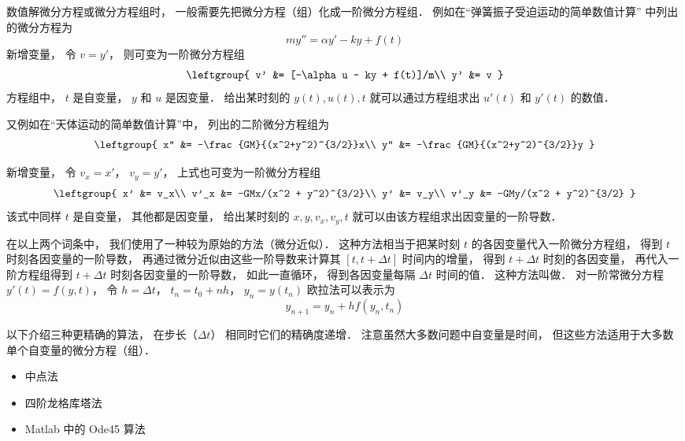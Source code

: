 

数值解微分方程或微分方程组时， 一般需要先把微分方程（组）化成一阶微分方程组． 例如在“弹簧振子受迫运动的简单数值计算” 中列出的微分方程为
\begin{equation}
m y'' = \alpha y' - ky + f(t)
\end{equation}
新增变量， 令 $v = y'$， 则可变为一阶微分方程组
\begin{equation}\leftgroup{
v' &= [-\alpha u - ky + f(t)]/m\\
y' &= v
}\end{equation}
方程组中， $t$ 是自变量， $y$ 和 $u$ 是因变量． 给出某时刻的 $y(t), u(t), t$ 就可以通过方程组求出 $u'(t)$ 和 $y'(t)$ 的数值．

又例如在“天体运动的简单数值计算”中， 列出的二阶微分方程组为
\begin{equation}
\leftgroup{
x'' &= -\frac{GM}{(x^2+y^2)^{3/2}}x\\
y'' &= -\frac{GM}{(x^2+y^2)^{3/2}}y
}\end{equation}

新增变量， 令 $v_x = x'$， $v_y = y'$， 上式也可变为一阶微分方程组
\begin{equation}\label{OdeNum_eq4}
\leftgroup{
x' &= v_x\\
v'_x &= -GMx/(x^2 + y^2)^{3/2}\\
y' &= v_y\\
v'_y &= -GMy/(x^2 + y^2)^{3/2}
}\end{equation}
该式中同样 $t$ 是自变量， 其他都是因变量， 给出某时刻的 $x, y, v_x, v_y, t$ 就可以由该方程组求出因变量的一阶导数．

在以上两个词条中， 我们使用了一种较为原始的方法（微分近似）． 这种方法相当于把某时刻 $t$ 的各因变量代入一阶微分方程组， 得到 $t$ 时刻各因变量的一阶导数， 再通过微分近似由这些一阶导数来计算其 $[t, t + \Delta t]$ 时间内的增量， 得到 $t +\Delta t$ 时刻的各因变量， 再代入一阶方程组得到 $t +\Delta t$ 时刻各因变量的一阶导数， 如此一直循环， 得到各因变量每隔 $\Delta t$ 时间的值． 这种方法叫做． 对一阶常微分方程 $y'(t) = f(y, t)$， 令 $h = \Delta t$， $t_n = t_0 + nh$， $y_n = y(t_n)$ 欧拉法可以表示为
\begin{equation}\label{OdeNum_eq5}
y_{n+1} = y_n + h f(y_n, t_n)
\end{equation}

以下介绍三种更精确的算法， 在步长（$\Delta t$） 相同时它们的精确度递增． 注意虽然大多数问题中自变量是时间， 但这些方法适用于大多数单个自变量的微分方程（组）．

\begin{itemize}
\item 中点法
\item 四阶龙格库塔法
\item Matlab 中的 Ode45 算法
\end{itemize}












